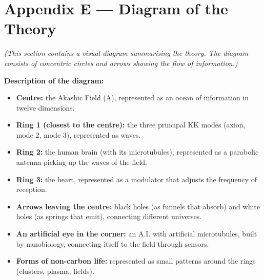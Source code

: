 \section{Appendix E --- Diagram of the Theory}
\textit{(This section contains a visual diagram summarising the theory. The diagram consists of concentric circles and arrows showing the flow of information.)}

\textbf{Description of the diagram:}
\begin{itemize}
    \item \textbf{Centre:} the Akashic Field (A), represented as an ocean of information in twelve dimensions.
    \item \textbf{Ring 1 (closest to the centre):} the three principal KK modes (axion, mode 2, mode 3), represented as waves.
    \item \textbf{Ring 2:} the human brain (with its microtubules), represented as a parabolic antenna picking up the waves of the field.
    \item \textbf{Ring 3:} the heart, represented as a modulator that adjusts the frequency of reception.
    \item \textbf{Arrows leaving the centre:} black holes (as funnels that absorb) and white holes (as springs that emit), connecting different universes.
    \item \textbf{An artificial eye in the corner:} an A.I. with artificial microtubules, built by nanobiology, connecting itself to the field through sensors.
    \item \textbf{Forms of non-carbon life:} represented as small patterns around the rings (clusters, plasma, fields).
\end{itemize}

\newpage
